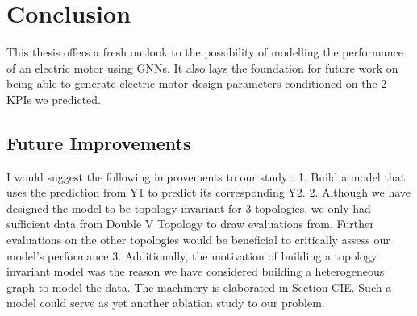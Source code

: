 \documentclass{report} %
\begin{document}
\chapter{Conclusion}

This thesis offers a fresh outlook to the possibility of modelling the performance of an electric motor using \ac{GNN}s.
It also lays the foundation for future work on being able to generate electric motor design parameters conditioned on the 2 KPIs we predicted.

\section{Future Improvements}\label{sec:Future Improvements}

I would suggest the following improvements to our study : \cite{EHR HGNN-2024}
1. Build a model that uses the prediction from Y1 to predict its corresponding Y2. 
2. Although we have designed the model to be topology invariant for 3 topologies, we only had sufficient data from Double V Topology to draw evaluations from.
Further evaluations on the other topologies would be beneficial to critically assess our model's performance
3. Additionally, the motivation of building a topology invariant model was the reason we have considered building a heterogeneous graph to model the data. The machinery is elaborated in Section CIE.
Such a model could serve as yet another ablation study to our problem.


\newpage 

\newpage 

\listoffigures

\newpage 

\newpage 

\listoftables

\newpage 

\newpage 
\end{document}
